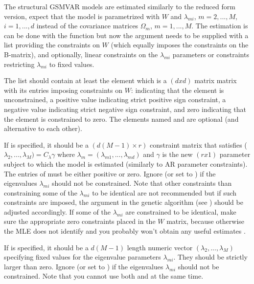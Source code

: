 \documentclass[nojss]{jss}
\begin{document}
The structural GSMVAR models are estimated similarly to the reduced form version, expect that the model is parametrized with $W$ and $\lambda_{mi}$, $m=2,...,M$, $i=1,...,d$ instead of the covariance matrices $\Omega_{m}$, $m=1,...,M$. The estimation is can be done with the function  but now the argument  needs to be supplied with a list providing the constraints on $W$ (which equally imposes the constraints on the B-matrix), and optionally, linear constraints on the $\lambda_{mi}$ parameters or constraints restricting $\lambda_{mi}$ to fixed values.

The list  should contain at least the element  which is a $(dxd)$ matrix matrix with its entries imposing constraints on $W$:  indicating that the element is unconstrained, a positive value indicating strict positive sign constraint, a negative value indicating strict negative sign constraint, and zero indicating that the element is constrained to zero. The elements named  and  are optional (and alternative to each other).

If  is specified, it should be a $(d(M-1) \times r)$ constraint matrix that satisfies ($\lambda_{2},...,\lambda_{M}) =C_{\lambda} \gamma$ where $\lambda_{m}=(\lambda_{m1},...,\lambda_{md})$ and $\gamma$ is the new $(r x 1)$ parameter subject to which the model is estimated (similarly to AR parameter constraints). The entries of  must be either positive or zero.  Ignore (or set to ) if the eigenvalues $\lambda_{mi}$ should not be constrained. Note that other constraints than constraining some of the $\lambda_{mi}$ to be identical are not recommended but if such constraints are imposed, the argument  in the genetic algorithm (see ) should be adjusted accordingly. If some of the $\lambda_{mi}$ are constrained to be identical, make sure the appropriate zero constraints placed in the $W$ matrix, because otherwise the MLE does not identify and you probably won't obtain any useful estimates \citep[see][Proposition 2]{Virolainen:2025}.

If  is specified, it should be a $d(M-1)$ length numeric vector $(\lambda_{2},...,\lambda_{M})$ specifying fixed values for the eigenvalue parameters $\lambda_{mi}$. They should be strictly larger than zero. Ignore (or set to ) if the eigenvalues $\lambda_{mi}$ should not be constrained. Note that you cannot use both  and  at the same time.
\end{document}
